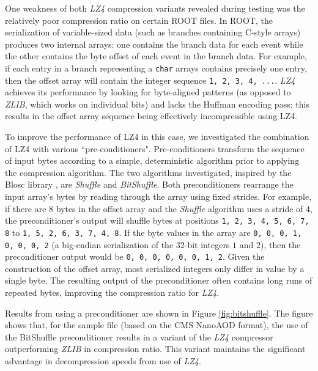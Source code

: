 \documentclass[12pt]{iopart}
\begin{document}
One weakness of both \textit{LZ4} compression variants revealed during testing was the relatively poor compression ratio on certain ROOT files.  In ROOT, the serialization of variable-sized data (such as branches containing C-style arrays) produces two internal arrays: one contains the branch data for each event while the other contains the byte offset of each event in the branch data.  For example, if each entry in a branch representing a \texttt{char} arrays contains precisely one entry, then the offset array will contain the integer sequence \texttt{1, 2, 3, 4, ...}.  \textit{LZ4} achieves its performance by looking for byte-aligned patterns (as opposed to \textit{ZLIB}, which works on individual bits) and lacks the Huffman encoding pass; this results in the offset array sequence being effectively incompressible using LZ4.

To improve the performance of LZ4 in this case, we investigated the combination of LZ4 with various ``pre-conditioners".  Pre-conditioners transform the sequence of input bytes according to a simple, deterministic algorithm prior to applying the compression algorithm.  The two algorithms investigated, inspired by the Blosc library \cite{blosc}, are \textit{Shuffle} and \textit{BitShuffle}.  Both preconditioners rearrange the input array's bytes by reading through the array using fixed strides.  For example, if there are 8 bytes in the offset array and the \textit{Shuffle} algorithm uses a stride of 4, the preconditioner's output will shuffle bytes at positions \texttt{1, 2, 3, 4, 5, 6, 7, 8} to \texttt{1, 5, 2, 6, 3, 7, 4, 8}.  If the byte values in the array are \texttt{0, 0, 0, 1, 0, 0, 0, 2} (a big-endian serialization of the 32-bit integers $1$ and $2$), then the preconditioner output would be \texttt{0, 0, 0, 0, 0, 0, 1, 2}.  Given the construction of the offset array, most serialized integers only differ in value by a single byte. The resulting output of the preconditioner often contains long runs of repeated bytes, improving the compression ratio for \textit{LZ4}.

Results from using a preconditioner are shown in Figure \ref{fig:bitshuffle}. The figure shows that, for the sample file (based on the CMS NanoAOD format), the use of the BitShuffle preconditioner results in a variant of the \textit{LZ4} compressor outperforming \textit{ZLIB} in compression ratio.  This variant maintains the significant advantage in decompression speeds from use of \textit{LZ4}.
\end{document}
